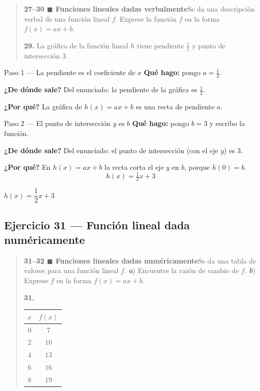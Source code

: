 \documentclass[11pt]{article}
\begin{document}
\begin{quote}
\textbf{27--30 $\blacksquare$ Funciones lineales dadas verbalmente}\quad Se da una descripción verbal de una función lineal $f$. Exprese la función $f$ en la forma $f(x)=ax+b$.

\textbf{29.} La gráfica de la función lineal $h$ tiene pendiente $\tfrac12$ y punto de intersección 3.
\end{quote}

\begin{paso}{Paso 1 --- La pendiente es el coeficiente de $x$}
\textbf{Qué hago:} pongo $a=\tfrac12$.

\textbf{¿De dónde sale?} Del enunciado: la pendiente de la gráfica es $\tfrac12$.

\textbf{¿Por qué?} La gráfica de $h(x)=ax+b$ es una recta de pendiente $a$.
\end{paso}

\begin{paso}{Paso 2 --- El punto de intersección $y$ es $b$}
\textbf{Qué hago:} pongo $b=3$ y escribo la función.

\textbf{¿De dónde sale?} Del enunciado: el punto de intersección (con el eje $y$) es $3$.

\textbf{¿Por qué?} En $h(x)=ax+b$ la recta corta el eje $y$ en $b$, porque $h(0)=b$.
\[
h(x)=\tfrac12 x+3
\]
\end{paso}

\begin{resp}
$h(x)=\dfrac{1}{2}x+3$
\end{resp}

\subsection*{Ejercicio 31 — Función lineal dada numéricamente}

\begin{quote}
\textbf{31--32 $\blacksquare$ Funciones lineales dadas numéricamente}\quad Se da una tabla de valores para una función lineal $f$. \textbf{\textit{a}}) Encuentre la razón de cambio de $f$. \textbf{\textit{b}}) Exprese $f$ en la forma $f(x)=ax+b$.

\textbf{31.}
\begin{center}
\begin{tabular}{c|c}
$x$ & $f(x)$\\ \hline
$0$ & $7$\\
$2$ & $10$\\
$4$ & $13$\\
$6$ & $16$\\
$8$ & $19$
\end{tabular}
\end{center}
\end{quote}
\end{document}
